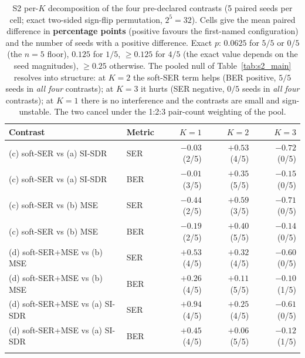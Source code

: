 \begin{table}[H]
\centering
\caption{S2 per-$K$ decomposition of the four pre-declared contrasts (5 paired seeds per cell; exact two-sided sign-flip permutation, $2^5{=}32$). Cells give the mean paired difference in \textbf{percentage points} (positive favours the first-named configuration) and the number of seeds with a positive difference. Exact $p$: $0.0625$ for $5/5$ or $0/5$ (the $n{=}5$ floor), $0.125$ for $1/5$, $\geq 0.125$ for $4/5$ (the exact value depends on the seed magnitudes), $\geq 0.25$ otherwise. The pooled null of Table~\ref{tab:s2_main} resolves into structure: at $K{=}2$ the soft-SER term helps (BER positive, $5/5$ seeds in \emph{all four} contrasts); at $K{=}3$ it hurts (SER negative, $0/5$ seeds in \emph{all four} contrasts); at $K{=}1$ there is no interference and the contrasts are small and sign-unstable. The two cancel under the 1:2:3 pair-count weighting of the pool.}
\label{tab:s2_perk}
\setlength{\tabcolsep}{4pt}
\footnotesize
\begin{tabular}{ll r r r}
\toprule
Contrast & Metric & $K{=}1$ & $K{=}2$ & $K{=}3$ \\
\midrule
(c) soft-SER vs (a) SI-SDR & SER & $-0.03$ (2/5) & $+0.53$ (4/5) & $-0.72$ (0/5) \\
(c) soft-SER vs (a) SI-SDR & BER & $-0.01$ (3/5) & $+0.35$ (5/5) & $-0.15$ (0/5) \\
\addlinespace[2pt]
(c) soft-SER vs (b) MSE & SER & $-0.44$ (2/5) & $+0.59$ (3/5) & $-0.71$ (0/5) \\
(c) soft-SER vs (b) MSE & BER & $-0.19$ (2/5) & $+0.40$ (5/5) & $-0.14$ (0/5) \\
\addlinespace[2pt]
(d) soft-SER+MSE vs (b) MSE & SER & $+0.53$ (4/5) & $+0.32$ (4/5) & $-0.60$ (0/5) \\
(d) soft-SER+MSE vs (b) MSE & BER & $+0.26$ (4/5) & $+0.11$ (5/5) & $-0.10$ (1/5) \\
\addlinespace[2pt]
(d) soft-SER+MSE vs (a) SI-SDR & SER & $+0.94$ (4/5) & $+0.25$ (4/5) & $-0.61$ (0/5) \\
(d) soft-SER+MSE vs (a) SI-SDR & BER & $+0.45$ (4/5) & $+0.06$ (5/5) & $-0.12$ (1/5) \\
\addlinespace[2pt]
\bottomrule
\end{tabular}
\end{table}
